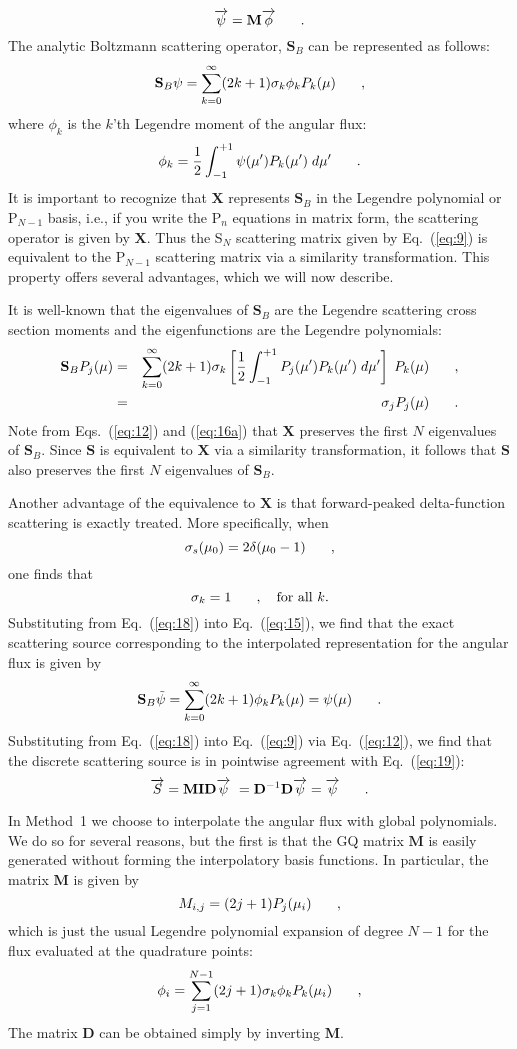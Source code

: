 \documentclass[12pt]{article}
\newcommand{\bracket}[1]{\left[ #1 \right]}
\renewcommand{\vec}[1]{\overrightarrow{#1}}
\newcommand{\bea}{\begin{eqnarray}}
\newcommand{\eea}{\end{eqnarray}}
\newcommand{\be}{\begin{equation}}
\newcommand{\ee}{\end{equation}}
\newcommand{\pec}{\hspace{0.25in},}
\newcommand{\pep}{\hspace{0.25in}.}
\newcommand{\LEQ}[1]{\label{eq:#1}}
\newcommand{\EQ}[1]{Eq.~(\ref{eq:#1})}
\newcommand{\REQ}[1]{\ref{eq:#1}}
\newcommand{\mS}{\mathbf{S}}
\newcommand{\mD}{\mathbf{D}}
\newcommand{\mM}{\mathbf{M}}
\newcommand{\mX}{\mathbf{X}}
\begin{document}
\begin{center}
\be
\vec{\psi} = \mM \vec{\phi} \pep
\LEQ{14}
\ee
The analytic Boltzmann scattering operator, $\mS_B$  can be represented as follows: 
\be
\mS_B \psi = \sum_{k=0}^{\infty} (2k+1) \sigma_k \phi_k P_k(\mu) \pec
\LEQ{15}
\ee
where $\phi_k$ is the $k$'th Legendre moment of the angular flux:
\be
\phi_k = \frac{1}{2} \int_{-1}^{+1}  \psi(\mu^{\prime}) P_k(\mu^{\prime}) \; d\mu^{\prime} \pep
\LEQ{16}
\ee
It is important to recognize that $\mX$ represents $\mS_B$ in the Legendre polynomial 
or P$_{N-1}$ basis, i.e., if you write the P$_n$ equations in matrix form, the scattering operator is 
given by $\mX$. Thus the S$_N$ scattering matrix given by \EQ{9} is equivalent to the P$_{N-1}$ scattering 
matrix via a similarity transformation. This property offers several advantages, which we will now describe. 

It is well-known that the eigenvalues of $\mS_B$ are the Legendre scattering cross section moments and the eigenfunctions are the Legendre polynomials: 
\bea
\mS_B P_{j}(\mu) & = & \sum_{k=0}^{\infty} (2k+1) \sigma_k  
\bracket{\frac{1}{2} \int_{-1}^{+1}  P_j(\mu^{\prime}) P_k(\mu^{\prime}) \; d\mu^{\prime} } \; P_k(\mu) \pec \nonumber \\
& = & \sigma_j P_j(\mu) \pep
\LEQ{16a}
\eea
Note from Eqs.~(\REQ{12}) and (\REQ{16a}) that $\mX$ preserves the first $N$ eigenvalues of $\mS_B$.  
Since $\mS$ is equivalent to $\mX$ via a similarity transformation, it follows that $\mS$ also 
preserves the first $N$ eigenvalues of $\mS_B$.
  
Another advantage of the equivalence to $\mX$ is that forward-peaked delta-function scattering is exactly treated.  
More specifically, when 
\be
\sigma_s(\mu_0) = 2 \delta(\mu_0-1) \pec
\LEQ{17}
\ee
one finds that 
\be
\sigma_k = 1  \pec \quad \mbox{for all $k$}.
\LEQ{18}
\ee
Substituting from \EQ{18} into \EQ{15}, we find that the exact scattering source corresponding to 
the interpolated representation for the angular flux is given by  
\be
\mS_B \tilde{\psi} =  \sum_{k=0}^{\infty} (2k+1) \phi_k P_k(\mu) = \psi(\mu) \pep
\LEQ{19}
\ee
Substituting from \EQ{18} into \EQ{9} via \EQ{12}, we find that the discrete scattering source is 
in pointwise agreement with \EQ{19}:
\be
\vec{S} = \mM \mathbf{I} \mD \vec{\psi} \ =  \mD^{-1} \mD \vec{\psi} = \vec{\psi} \pep
\LEQ{20}
\ee

In Method~1 we choose to interpolate the angular flux with global polynomials. We do so for several reasons, but 
the first is that the GQ matrix $\mM$ is easily generated without forming the interpolatory basis functions.  
In particular, the matrix $\mM$ is given by 
\be
M_{i,j} = (2j+1) P_j(\mu_i) \pec
\LEQ{21}
\ee
which is just the usual Legendre polynomial expansion of degree $N-1$ for the flux evaluated at the quadrature points:
\be
\phi_i = \sum_{j=1}^{N-1} (2j+1) \sigma_{k} \phi_k P_{k}(\mu_i) \pec
\LEQ{22}
\ee
The matrix $\mD$ can be obtained simply by inverting $\mM$. 


\end{center}
\end{document}

